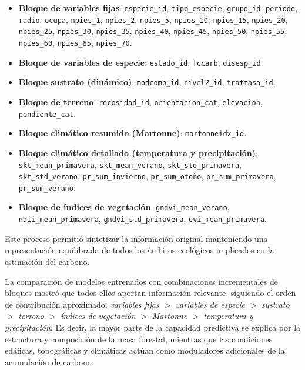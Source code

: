 \begin{itemize}
    \item \textbf{Bloque de variables fijas}:
          \texttt{especie\_id}, \texttt{tipo\_especie}, \texttt{grupo\_id}, \texttt{periodo}, \texttt{radio}, \texttt{ocupa},
          \texttt{npies\_1}, \texttt{npies\_2}, \texttt{npies\_5},
          \texttt{npies\_10}, \texttt{npies\_15}, \texttt{npies\_20},
          \texttt{npies\_25}, \texttt{npies\_30}, \texttt{npies\_35},
          \texttt{npies\_40}, \texttt{npies\_45}, \texttt{npies\_50},
          \texttt{npies\_55}, \texttt{npies\_60}, \texttt{npies\_65},
          \texttt{npies\_70}.

    \item \textbf{Bloque de variables de especie}:
          \texttt{estado\_id}, \texttt{fccarb}, \texttt{disesp\_id}.

    \item \textbf{Bloque sustrato (dinámico)}:
          \texttt{modcomb\_id}, \texttt{nivel2\_id},
          \texttt{tratmasa\_id}.

    \item \textbf{Bloque de terreno}:
          \texttt{rocosidad\_id},
          \texttt{orientacion\_cat}, \texttt{elevacion}, \texttt{pendiente\_cat}.

    \item \textbf{Bloque climático resumido (Martonne)}:
          \texttt{martonneidx\_id}.

    \item \textbf{Bloque climático detallado (temperatura y precipitación)}:
          \texttt{skt\_mean\_primavera}, \texttt{skt\_mean\_verano},
          \texttt{skt\_std\_primavera}, \texttt{skt\_std\_verano},
          \texttt{pr\_sum\_invierno}, \texttt{pr\_sum\_otoño},
          \texttt{pr\_sum\_primavera}, \texttt{pr\_sum\_verano}.

    \item \textbf{Bloque de índices de vegetación}:
          \texttt{gndvi\_mean\_verano}, \texttt{ndii\_mean\_primavera},
          \texttt{gndvi\_std\_primavera}, \texttt{evi\_mean\_primavera}.
\end{itemize}

Este proceso permitió sintetizar la información original manteniendo una representación equilibrada de todos los ámbitos ecológicos implicados en la estimación del carbono.

La comparación de modelos entrenados con combinaciones incrementales de bloques mostró que todos ellos aportan información relevante, siguiendo el orden de contribución aproximado: \textit{variables fijas} $>$ \textit{variables de especie} $>$ \textit{sustrato} $>$ \textit{terreno} $>$ \textit{índices de vegetación} $>$ \textit{Martonne} $>$ \textit{temperatura y precipitación}. Es decir, la mayor parte de la capacidad predictiva se explica por la estructura y composición de la masa forestal, mientras que las condiciones edáficas, topográficas y climáticas actúan como moduladores adicionales de la acumulación de carbono.

